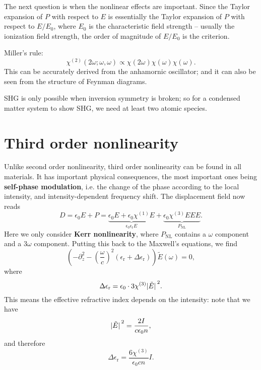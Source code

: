 \documentclass[hyperref, a4paper]{article}
\newcommand*{\concept}[1]{{\textbf{#1}}}
\newcommand{\epsr}{\epsilon_{\text{r}}}
\newcommand*{\chitwo}{\chi^{(2)}}
\begin{document}
The next question is when the nonlinear effects are important.
Since the Taylor expansion of $P$ with respect to $E$ 
is essentially the Taylor expansion of $P$ with respect to $E / E_0$,
where $E_0$ is the characteristic field strength
-- usually the ionization field strength,
the order of magnitude of $E / E_0$ is the criterion.


Miller's rule:
\begin{equation}
    \chitwo(2\omega; \omega, \omega) \propto
    \chi(2 \omega) \chi(\omega) \chi(\omega).
\end{equation}
This can be accurately derived from the anhamornic oscillator;
and it can also be seen from the structure of Feynman diagrams.

SHG is only possible when inversion symmetry is broken; 
so for a condensed matter system to show SHG, 
we need at least two atomic species.

\section{Third order nonlinearity}

Unlike second order nonlinearity,
third order nonlinearity can be found in all materials.
It has important physical consequences,
the most important ones being \concept{self-phase modulation}, 
i.e. the change of the phase according to the local intensity, 
and intensity-dependent frequency shift.
The displacement field now reads 
\begin{equation}
    D = \epsilon_0 E + P = \underbrace{
        \epsilon_0 E + \epsilon_0 \chi^{(1)} E
    }_{\epsilon_0 \epsr E} + 
    \underbrace{
    \epsilon_0 \chi^{(3)} E E E 
    }_{P_{\text{NL}}}.
\end{equation}
Here we only consider \concept{Kerr nonlinearity},
where $P_{\text{NL}}$ contains a $\omega$ component 
and a $3 \omega$ component.
Putting this back to the Maxwell's equations, we find 
\begin{equation}
    \left(
        - \partial_z^2 
        - \left(\frac{\omega}{c}\right)^2 
        (\epsr + \Delta \epsr)
    \right) \tilde{E}(\omega) = 0,
\end{equation}
where 
\begin{equation}
    \Delta \epsr = \epsilon_0 \cdot 3 \chi^{(3)} \abs*{\tilde{E}}^2.
\end{equation}
This means the effective refractive index depends on the intensity:
note that we have 
\begin{equation}
    \abs*{\tilde{E}}^2 = \frac{2 I}{c \epsilon_0 n},
\end{equation}
and therefore 
\begin{equation}
    \Delta \epsr = \frac{6 \chi^{(3)}}{\epsilon_0 c n} I.
\end{equation}
\end{document}
